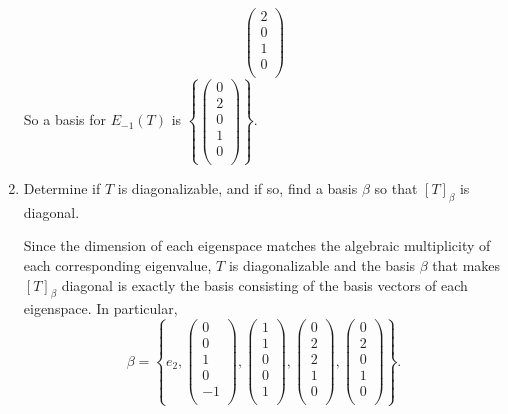 \documentclass{eh-homework}
\begin{document}
\begin{question}{2}
\begin{enumerate}[label=(\alph*)]
\[\begin{pmatrix}
                 2 \\
                 0 \\
                 1 \\
                 0 \\
            \end{pmatrix}
        \]
        So a basis for \(E_{-1}(T)\) is \(\left\{ \begin{pmatrix}
            0 \\
            2 \\
            0 \\
            1 \\
            0 \\
       \end{pmatrix} \right\}\).

        \item Determine if $T$ is diagonalizable, and if so, find a basis $\beta$ so that $[T]_\beta$ is diagonal.
        
        Since the dimension of each eigenspace matches the algebraic multiplicity of each corresponding eigenvalue, \(T\) is diagonalizable and the basis \(\beta\) that makes \([T]_\beta\) diagonal is exactly the basis consisting of the basis vectors of each eigenspace. In particular,
        \[
            \beta = \left\{ e_2, \begin{pmatrix}
                0 \\
                0 \\
                1 \\
                0 \\
                -1 \\
           \end{pmatrix},\begin{pmatrix}
            1 \\
            1 \\
            0 \\
            0 \\
            1 \\
       \end{pmatrix},\begin{pmatrix}
            0 \\
            2 \\
            2 \\
            1 \\
            0 \\
        \end{pmatrix},\begin{pmatrix}
            0 \\
            2 \\
            0 \\
            1 \\
            0 \\
       \end{pmatrix} \right\}.
        \]
    \end{enumerate}
    \end{question}
\end{document}

